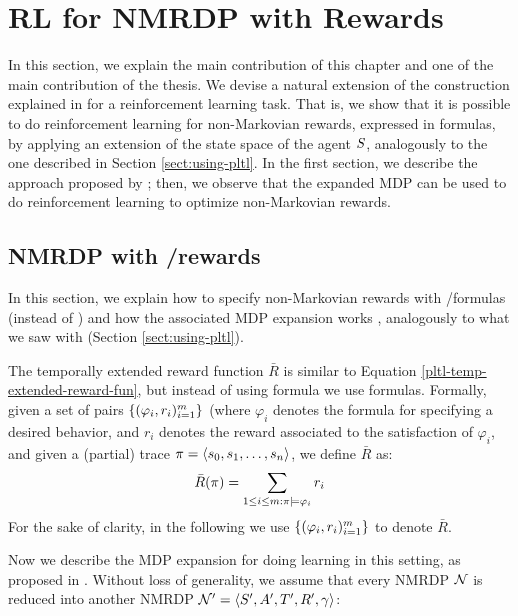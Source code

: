 \section{RL for NMRDP with \LLf Rewards}\label{sect:nmrdp-llf-rewards}
In this section, we explain the main contribution of this chapter and one of the main contribution of the thesis. We devise a natural extension of the construction explained in \citep{AAAI1817342} for a reinforcement learning task. That is, we show that it is possible to do reinforcement learning for non-Markovian rewards, expressed in \LLf formulas, by applying an extension of the state space of the agent $S$, analogously to the one described in Section \ref{sect:using-pltl}.
In the first section, we describe the approach proposed by \citep{AAAI1817342}; then, we observe that the expanded MDP can be used to do reinforcement learning to optimize \LLf non-Markovian rewards.

\subsection{NMRDP with \LTLf/\LDLf rewards}\label{sect:nmrdp-llf-rewards-small}
In this section, we explain how to specify non-Markovian rewards with \LTLf/\LDLf  formulas (instead of \PLTL) and how the associated MDP expansion works \citep{AAAI1817342}, analogously to what we saw with \PLTL (Section \ref{sect:using-pltl}).

The temporally extended reward function $\bar{R}$ is similar to Equation \ref{pltl-temp-extended-reward-fun}, but instead of using \PLTL formula we use \LLf formulas. Formally, given a set of pairs $\{(\varphi_i, r_i)^m_{i=1}\}$ (where $\varphi_i$ denotes the \LLf formula for specifying a desired behavior, and $r_i$ denotes the reward associated to the satisfaction of $\varphi_i$, and given a (partial) trace $\pi = \langle s_0, s_1, \dots, s_n \rangle$, we define $\bar{R}$ as:
\begin{equation}
\bar{R}(\pi) = \sum_{1\le i\le m: \pi \models \varphi_i} r_i
\end{equation}
For the sake of clarity, in the following we use $\{(\varphi_i, r_i)^m_{i=1}\}$ to denote $\bar{R}$.

Now we describe the MDP expansion for doing learning in this setting, as proposed in \citep{AAAI1817342}. 
Without loss of generality, we assume that every NMRDP $\mathcal{N}$ is reduced into another NMRDP $\mathcal{N}'=\langle S', A', T', R', \gamma \rangle$:


